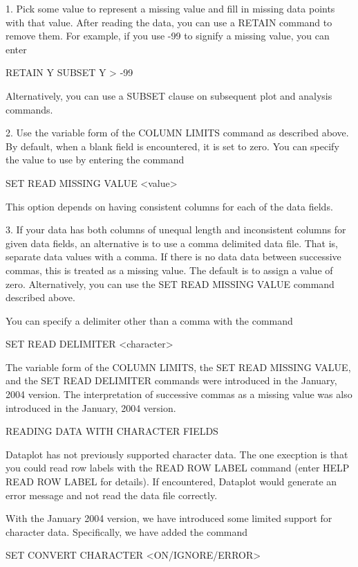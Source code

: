    1. Pick some value to represent a missing value and fill
      in missing data points with that value.  After reading
      the data, you can use a RETAIN command to remove them.
      For example, if you use -99 to signify a missing value,
      you can enter

          RETAIN Y SUBSET Y > -99

      Alternatively, you can use a SUBSET clause on subsequent
      plot and analysis commands.

   2. Use the variable form of the COLUMN LIMITS command as
      described above.  By default, when a blank field is
      encountered, it is set to zero.  You can specify the
      value to use by entering the command

        SET READ MISSING VALUE  <value>

      This option depends on having consistent columns for
      each of the data fields.

   3. If your data has both columns of unequal length and
      inconsistent columns for given data fields, an alternative
      is to use a comma delimited data file.  That is, separate
      data values with a comma.  If there is no data data between
      successive commas, this is treated as a missing value.  The
      default is to assign a value of zero.  Alternatively, you
      can use the SET READ MISSING VALUE command described above.

      You can specify a delimiter other than a comma with the
      command

          SET READ DELIMITER <character>

      The variable form of the COLUMN LIMITS, the
      SET READ MISSING VALUE, and the SET READ DELIMITER commands
      were introduced in the January, 2004 version.  The
      interpretation of successive commas as a missing value was
      also introduced in the January, 2004 version.


READING DATA WITH CHARACTER FIELDS

Dataplot has not previously supported character data.  The one
execption is that you could read row labels with the READ ROW LABEL
command (enter HELP READ ROW LABEL for details).  If encountered,
Dataplot would generate an error message and not read the data file
correctly. 

With the January 2004 version, we have introduced some limited
support for character data.  Specifically, we have added the command

     SET CONVERT CHARACTER <ON/IGNORE/ERROR>

